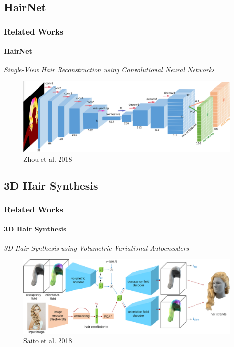 
\subsection{HairNet}
\begin{frame}\frametitle{Related Works}
    \framesubtitle{HairNet}

    \normalsize{\textcolor{myBlue}{\emph{Single-View Hair Reconstruction using Convolutional Neural Networks}}}
    
    \begin{figure}[ht]
        \centering
        \includegraphics[width=0.8\linewidth]{assets/figures/baselines/HairNet.png}
        \caption{Zhou et al. 2018\cite{Zhou2018SingleViewHR}}
        \label{fig:hairnet}
    \end{figure}
\end{frame}


\subsection{3D Hair Synthesis}
\begin{frame}\frametitle{Related Works}
    \framesubtitle{3D Hair Synthesis}

    \normalsize{\textcolor{myBlue}{\emph{3D Hair Synthesis using Volumetric Variational Autoencoders}}}
    
    \begin{figure}[ht]
        \centering
        \includegraphics[width=0.8\linewidth]{assets/figures/baselines/3DHairSynthesis.png}
        \caption{Saito et al. 2018\cite{Saito20183DHS}}
        \label{fig:3dhairsynthesis}
    \end{figure}
\end{frame}


